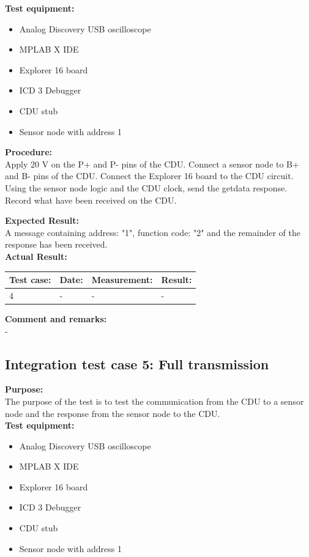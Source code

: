 \textbf{Test equipment:}
\begin{itemize}
\item Analog Discovery USB oscilloscope
\item MPLAB X IDE
\item Explorer 16 board
\item ICD 3 Debugger
\item CDU stub
\item Sensor node with address 1
\end{itemize}

\textbf{Procedure:}\\
Apply 20 V on the P+ and P- pins of the CDU. Connect a sensor node to B+ and B- pins of the CDU. Connect the Explorer 16 board to the CDU circuit. Using the sensor node logic and the CDU clock, send the getdata response. Record what have been received on the CDU.

\textbf{Expected Result:}\\
A message containing address: "1", function code: "2" and the remainder of the response has been received.\\

\textbf{Actual Result:}\\
\begin{table}[H]
\centering
\begin{tabular}{|p{2cm}|p{2cm}|p{3cm}|p{2cm}|}\hline
\textbf{Test case:} & \textbf{Date:} & \textbf{Measurement:} & \textbf{Result:} \\ \hline
4 & - & - & - \\ \hline
\end{tabular}
\end{table}


\textbf{Comment and remarks:}\\
-\\
\subsection{Integration test case 5: Full transmission}
\textbf{Purpose:}\\
The purpose of the test is to test the communication from the CDU to a sensor node and the response from the sensor node to the CDU.\\

\textbf{Test equipment:}
\begin{itemize}
\item Analog Discovery USB oscilloscope
\item MPLAB X IDE
\item Explorer 16 board
\item ICD 3 Debugger
\item CDU stub
\item Sensor node with address 1
\end{itemize}

